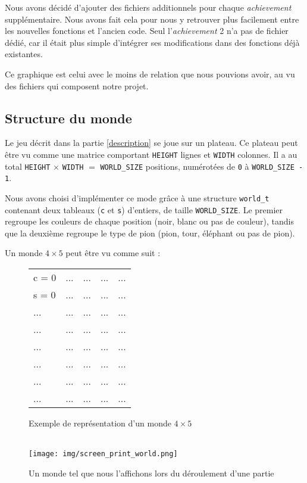 \documentclass[a4paper]{article}
\begin{document}
Nous avons décidé d'ajouter des fichiers additionnels pour chaque \emph{achievement} supplémentaire. Nous avons fait cela pour nous y retrouver plus facilement entre les nouvelles fonctions et l'ancien code. Seul l'\emph{achievement} 2 n'a pas de fichier dédié, car il était plus simple d'intégrer ses modifications dans des fonctions déjà existantes.

Ce graphique est celui avec le moins de relation que nous pouvions avoir, au vu des fichiers qui composent notre projet.

\subsection{Structure du monde}
\label{struct monde}

Le jeu décrit dans la partie \ref{description} se joue sur un plateau. Ce plateau peut être vu comme une matrice comportant \verb|HEIGHT| lignes et \verb|WIDTH| colonnes. Il a au total \verb|HEIGHT| $\times$ \verb|WIDTH| $=$ \verb|WORLD_SIZE| positions, numérotées de \verb|0| à \verb|WORLD_SIZE - 1|.

Nous avons choisi d'implémenter ce mode grâce à une structure \verb|world_t| contenant deux tableaux (\verb|c| et \verb|s|) d'entiers, de taille \verb|WORLD_SIZE|. Le premier regroupe les couleurs de chaque position (noir, blanc ou pas de couleur), tandis que la deuxième regroupe le type de pion (pion, tour, éléphant ou pas de pion).

Un monde $4\times5$ peut être vu comme suit :

\begin{figure}[H]
    \centering
    \begin{tabular}{|p{0.9cm}|p{0.9cm}|p{0.9cm}|p{0.9cm}|p{0.9cm}|}
        \hline
        c = 0 & ... & ... & ... & ...\\[0.4cm]
        s = 0 & ... & ... & ... & ...\\
        \hline
        ... & ... & ... & ... & ...\\[0.4cm]
        ... & ... & ... & ... & ...\\
        \hline
        ... & ... & ... & ... & ...\\[0.4cm]
        ... & ... & ... & ... & ...\\
        \hline
        ... & ... & ... & ... & ...\\[0.4cm]
        ... & ... & ... & ... & ...\\
        \hline
    \end{tabular}
    \caption{Exemple de représentation d'un monde $4\times5$}
    \label{fig:repr_world}~\\[1cm]

    \texttt{[image: img/screen\_print\_world.png]}
    \caption{Un monde tel que nous l'affichons lors du déroulement d'une partie}
    \label{fig:print_world}
\end{figure}
\end{document}
